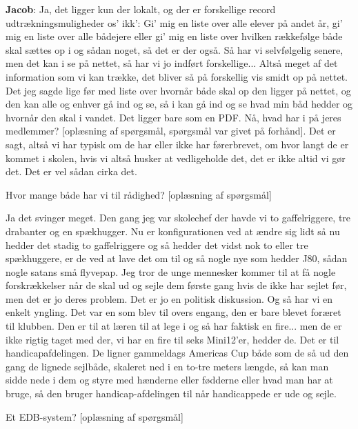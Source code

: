 \textbf{Jacob}: Ja, det ligger kun der lokalt, og der er forskellige record udtrækningsmuligheder os' ikk': Gi' mig en liste over alle elever på andet år, gi' mig en liste over alle bådejere eller gi' mig en liste over hvilken rækkefølge både skal sættes op i og sådan noget, så det er der også. 
Så har vi selvfølgelig senere, men det kan i se på nettet, så har vi jo indført forskellige... Altså meget af det information som vi kan trække, det bliver så på forskellig vis smidt op på nettet. 
Det jeg sagde lige før med liste over hvornår både skal op den ligger på nettet, og den kan alle og enhver gå ind og se, så i kan gå ind og se hvad min båd hedder og hvornår den skal i vandet. Det ligger bare som en PDF. 
Nå, hvad har i på jeres medlemmer? [oplæsning af spørgsmål, spørgsmål var givet på forhånd].
Det er sagt, altså vi har typisk om de har eller ikke har førerbrevet, om hvor langt de er kommet i skolen, hvis vi altså husker at vedligeholde det, det er ikke altid vi gør det. 
Det er vel sådan cirka det. 

Hvor mange både har vi til rådighed? [oplæsning af spørgsmål]

Ja det svinger meget. 
Den gang jeg var skolechef der havde vi to gaffelriggere, tre drabanter og en spækhugger. 
Nu er konfigurationen ved at ændre sig lidt så nu hedder det stadig to gaffelriggere og så hedder det vidst nok to eller tre spækhuggere, er de ved at lave det om til og så nogle nye som hedder J80, sådan nogle satans små flyvepap. 
Jeg tror de unge mennesker kommer til at få nogle forskrækkelser når de skal ud og sejle dem første gang hvis de ikke har sejlet før, men det er jo deres problem. 
Det er jo en politisk diskussion. 
Og så har vi en enkelt yngling. 
Det var en som blev til overs engang, den er bare blevet foræret til klubben. 
Den er til at læren til at lege i og så har faktisk en fire... men de er ikke rigtig taget med der, vi har en fire til seks Mini12'er, hedder de. 
Det er til handicapafdelingen. 
De ligner gammeldags Americas Cup både som de så ud den gang de lignede sejlbåde, skaleret ned i en to-tre meters længde, så kan man sidde nede i dem og styre med hænderne eller fødderne eller hvad man har at bruge, så den bruger handicap-afdelingen til når handicappede er ude og sejle. 

Et EDB-system? [oplæsning af spørgsmål]

